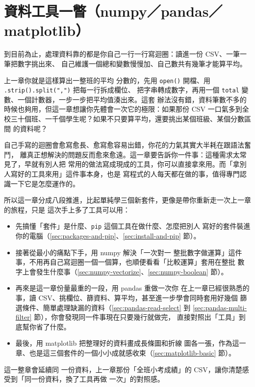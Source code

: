 \chapter{資料工具一瞥（numpy／pandas／matplotlib）}
\label{ch:data-tools}

到目前為止，處理資料靠的都是你自己一行一行寫迴圈：讀進一份 CSV、一筆一筆把數字挑出來、
自己維護一個總和變數慢慢加、自己數共有幾筆才能算平均。

上一章你就是這樣算出一整班的平均
分數的，先用 \texttt{open()} 開檔、用 \texttt{.strip().split(",")} 把每一行拆成欄位、
把字串轉成數字，再用一個 \texttt{total} 變數、一個計數器，一步一步把平均值湊出來。這套
辦法沒有錯，資料筆數不多的時候也夠用，但這一章想讓你先體會一次它的極限：如果那份 CSV
一口氣多到全校三十個班、一千個學生呢？如果不只要算平均，還要挑出某個班級、某個分數區間
的資料呢？

自己手寫的迴圈會愈寫愈長、愈寫愈容易出錯，你花的力氣其實大半耗在跟語法奮鬥，
離真正想解決的問題反而愈來愈遠。這一章要告訴你一件事：這種需求太常見了，早就有別人把
常用的做法寫成現成的工具，你可以直接拿來用。而「拿別人寫好的工具來用」這件事本身，也是
寫程式的人每天都在做的事，值得專門認識一下它是怎麼運作的。

所以這一章分成八段推進，比起單純學三個新套件，更像是帶你重新走一次上一章的旅程，只是
這次手上多了工具可以用：

\begin{itemize}
\item 先搞懂「套件」是什麼、\texttt{pip} 這個工具在做什麼、怎麼把別人
寫好的套件裝進你的電腦（\ref{sec:packages-and-pip}、\ref{sec:install-and-pip} 節）。
\item 接著從最小的痛點下手，用 numpy 解決「一次對一
整批數字做運算」這件事，不用再自己寫迴圈一個一個算，也順便看看「比較運算」套用在整批
數字上會發生什麼事（\ref{sec:numpy-vectorize}、\ref{sec:numpy-boolean} 節）。
\item 再來是這一章份量最重的一段，用 pandas 重做一次你
在上一章已經很熟悉的事，讀 CSV、挑欄位、篩資料、算平均，甚至進一步學會同時套用好幾個
篩選條件、簡單處理缺漏的資料（\ref{sec:pandas-read-select} 到 \ref{sec:pandas-multi-filter} 節），你會發現同一件事現在只要幾行就做完，
直接對照出「工具」到底幫你省了什麼。
\item 最後，用 matplotlib 把整理好的資料畫成長條圖和折線
圖各一張，作為這一章、也是這三個套件的一個小小成就感收束（\ref{sec:matplotlib-basic} 節）。
\end{itemize}

這一整章會延續同
一份資料，上一章那份「全班小考成績」的 CSV，讓你清楚感受到「同一份資料，換了工具再做
一次」的對照感。

